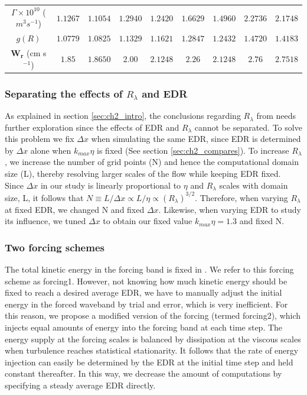 \begin{table}
\begin{center}
\begin{tabular}{ccccccccc}
$\Gamma \times10^{10}$ ($m^3 s^{-1}$)  &   $1.1267$  & $1.1054$ & $1.2940$  & $1.2420$  & $1.6629$ & $1.4960$  & $2.2736$ &  $2.1748$ \\ 

$g(R)$ & $1.0779$ & $1.0825$  & $1.1329$  & $1.1621$ & $1.2847$  & $1.2432$ & $1.4720$ & $1.4183$  \\ 
$\mathbf{W_r}$ (cm s$^{-1}$) & $1.85$  &  $1.8650$  &  $2.00$  & $2.1248$  & $2.26$   & $2.1248$  & $2.76$ & $2.7518$ \\

\hline 
\end{tabular} 
\end{center}
\end{table}

\subsubsection{Separating the effects of $R_\lambda$ and EDR} \label{sec:ch2_separate}

As explained in section \ref{sec:ch2_intro}, the conclusions regarding $R_\lambda$ from \citet{Franklin2005} needs further exploration since the effects of EDR and $R_\lambda$ cannot be separated. To solve this problem we fix $\Delta x$ when simulating the same EDR, since EDR is determined by $\Delta x$ alone when $k_{max}\eta$ is fixed (See section \ref{sec:ch2_compares}). To increase $R_\lambda$, we increase the number of grid points (N) and hence the computational domain size (L), thereby resolving larger scales of the flow while keeping EDR fixed. Since $\Delta x$ in our study is linearly proportional to $\eta$ and $R_\lambda$ scales with domain size, L, it follows that $N \equiv L/\Delta x \propto L/\eta \propto (R_\lambda)^{3/2}$. Therefore, when varying $R_\lambda$ at fixed EDR, we changed N and fixed $\Delta x$. Likewise, when varying EDR to study its influence, we tuned $\Delta x$ to obtain our fixed value $k_{max} \eta=1.3$ and fixed N. 

\subsubsection{Two forcing schemes}\label{sec:ch2_forcing}

The total kinetic energy in the forcing band is fixed in \citet{Franklin2005}. We refer to this forcing scheme as forcing1. However, not knowing how much kinetic energy should be fixed to reach a desired average EDR, we have to manually adjust the initial energy in the forced waveband by trial and error, which is very inefficient. For this reason, we propose a modified version of the forcing (termed forcing2), which injects equal amounts of energy into the forcing band at each time step. The energy supply at the forcing scales is balanced by dissipation at the viscous scales when turbulence reaches statistical stationarity. It follows that the rate of energy injection can  easily be determined by the EDR at the initial time step and held constant thereafter. In this way, we decrease the amount of computations by specifying a steady average EDR directly.

